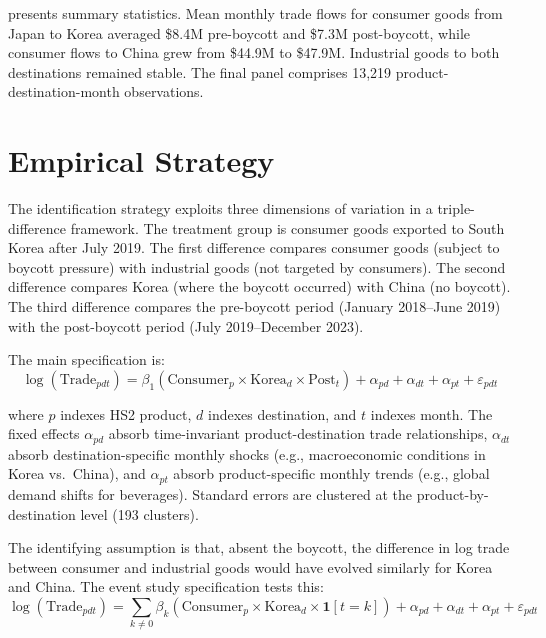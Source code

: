 \documentclass[12pt]{article}
\begin{document}
 presents summary statistics. Mean monthly trade flows for consumer goods from Japan to Korea averaged \$8.4M pre-boycott and \$7.3M post-boycott, while consumer flows to China grew from \$44.9M to \$47.9M. Industrial goods to both destinations remained stable. The final panel comprises 13,219 product-destination-month observations.




\section{Empirical Strategy}

The identification strategy exploits three dimensions of variation in a triple-difference framework. The treatment group is consumer goods exported to South Korea after July 2019. The first difference compares consumer goods (subject to boycott pressure) with industrial goods (not targeted by consumers). The second difference compares Korea (where the boycott occurred) with China (no boycott). The third difference compares the pre-boycott period (January 2018--June 2019) with the post-boycott period (July 2019--December 2023).

The main specification is:
\begin{equation}
\log(\text{Trade}_{pdt}) = \beta_1 (\text{Consumer}_p \times \text{Korea}_d \times \text{Post}_t) + \alpha_{pd} + \alpha_{dt} + \alpha_{pt} + \varepsilon_{pdt}
\label{eq:ddd}
\end{equation}

\noindent where $p$ indexes HS2 product, $d$ indexes destination, and $t$ indexes month. The fixed effects $\alpha_{pd}$ absorb time-invariant product-destination trade relationships, $\alpha_{dt}$ absorb destination-specific monthly shocks (e.g., macroeconomic conditions in Korea vs.\ China), and $\alpha_{pt}$ absorb product-specific monthly trends (e.g., global demand shifts for beverages). Standard errors are clustered at the product-by-destination level (193 clusters).

The identifying assumption is that, absent the boycott, the difference in log trade between consumer and industrial goods would have evolved similarly for Korea and China. The event study specification tests this:
\begin{equation}
\log(\text{Trade}_{pdt}) = \sum_{k \neq 0} \beta_k (\text{Consumer}_p \times \text{Korea}_d \times \mathbf{1}[t = k]) + \alpha_{pd} + \alpha_{dt} + \alpha_{pt} + \varepsilon_{pdt}
\label{eq:es}
\end{equation}
\end{document}
